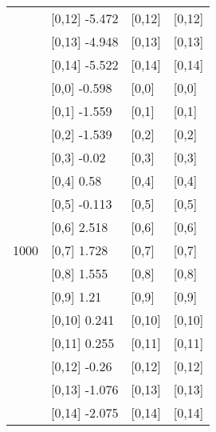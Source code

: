 \begin{table}
\begin{tabular}[t]{llll}
 & {}[0,12] -5.472 & {}[0,12] & {}[0,12]\\
 & {}[0,13] -4.948 & {}[0,13] & {}[0,13]\\
 & {}[0,14] -5.522 & {}[0,14] & {}[0,14]\\
\addlinespace
 & {}[0,0] -0.598 & {}[0,0] & {}[0,0]\\
 & {}[0,1] -1.559 & {}[0,1] & {}[0,1]\\
 & {}[0,2] -1.539 & {}[0,2] & {}[0,2]\\
 & {}[0,3] -0.02 & {}[0,3] & {}[0,3]\\
 & {}[0,4] 0.58 & {}[0,4] & {}[0,4]\\
\addlinespace
 & {}[0,5] -0.113 & {}[0,5] & {}[0,5]\\
 & {}[0,6] 2.518 & {}[0,6] & {}[0,6]\\
1000 & {}[0,7] 1.728 & {}[0,7] & {}[0,7]\\
 & {}[0,8] 1.555 & {}[0,8] & {}[0,8]\\
 & {}[0,9] 1.21 & {}[0,9] & {}[0,9]\\
\addlinespace
 & {}[0,10] 0.241 & {}[0,10] & {}[0,10]\\
 & {}[0,11] 0.255 & {}[0,11] & {}[0,11]\\
 & {}[0,12] -0.26 & {}[0,12] & {}[0,12]\\
 & {}[0,13] -1.076 & {}[0,13] & {}[0,13]\\
 & {}[0,14] -2.075 & {}[0,14] & {}[0,14]\\
\bottomrule
\end{tabular}
\end{table}
